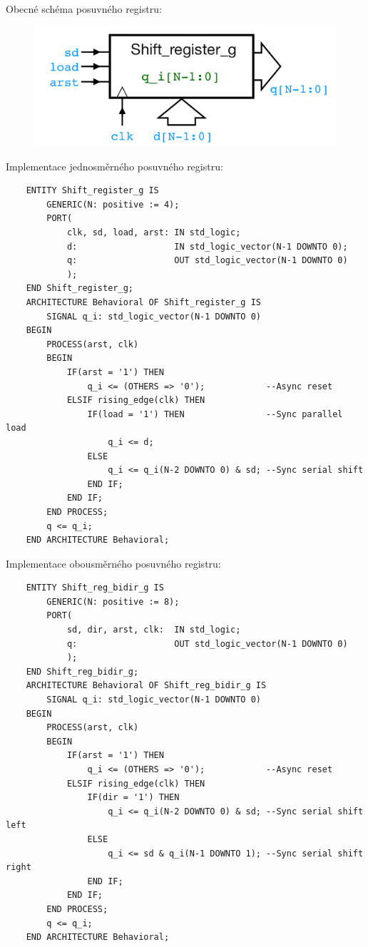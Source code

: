 Obecné schéma posuvného registru:\\
\begin{figure}[h!]
    \centering
    \includegraphics[scale = 0.5]{img/ShiftReg.png}
\end{figure}

Implementace jednosměrného posuvného registru:\\
\begin{lstlisting}
    ENTITY Shift_register_g IS
        GENERIC(N: positive := 4);
        PORT(
            clk, sd, load, arst: IN std_logic;
            d:                   IN std_logic_vector(N-1 DOWNTO 0);
            q:                   OUT std_logic_vector(N-1 DOWNTO 0)
            );
    END Shift_register_g;
    ARCHITECTURE Behavioral OF Shift_register_g IS
        SIGNAL q_i: std_logic_vector(N-1 DOWNTO 0)
    BEGIN
        PROCESS(arst, clk)
        BEGIN
            IF(arst = '1') THEN
                q_i <= (OTHERS => '0');            --Async reset
            ELSIF rising_edge(clk) THEN
                IF(load = '1') THEN                --Sync parallel load
                    q_i <= d;
                ELSE
                    q_i <= q_i(N-2 DOWNTO 0) & sd; --Sync serial shift
                END IF;
            END IF;
        END PROCESS;
        q <= q_i;
    END ARCHITECTURE Behavioral;
\end{lstlisting}

Implementace obousměrného posuvného registru:\\
\begin{lstlisting}
    ENTITY Shift_reg_bidir_g IS
        GENERIC(N: positive := 8);
        PORT(
            sd, dir, arst, clk:  IN std_logic;
            q:                   OUT std_logic_vector(N-1 DOWNTO 0)
            );
    END Shift_reg_bidir_g;
    ARCHITECTURE Behavioral OF Shift_reg_bidir_g IS
        SIGNAL q_i: std_logic_vector(N-1 DOWNTO 0)
    BEGIN
        PROCESS(arst, clk)
        BEGIN
            IF(arst = '1') THEN
                q_i <= (OTHERS => '0');            --Async reset
            ELSIF rising_edge(clk) THEN
                IF(dir = '1') THEN
                    q_i <= q_i(N-2 DOWNTO 0) & sd; --Sync serial shift left
                ELSE
                    q_i <= sd & q_i(N-1 DOWNTO 1); --Sync serial shift right
                END IF;
            END IF;
        END PROCESS;
        q <= q_i;
    END ARCHITECTURE Behavioral;
\end{lstlisting}

